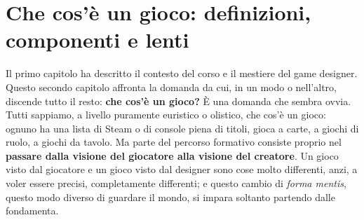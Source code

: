 
\chapter[Che cos'è un gioco]{Che cos'è un gioco: definizioni, componenti e lenti}
\label{cap:che-cos-e-un-gioco}

Il primo capitolo ha descritto il contesto del corso e il mestiere del game
designer. Questo secondo capitolo affronta la domanda da cui, in un modo o
nell'altro, discende tutto il resto: \textbf{che cos'è un gioco?} È una
domanda che sembra ovvia. Tutti sappiamo, a livello puramente euristico o
olistico, che cos'è un gioco: ognuno ha una lista di Steam o di console piena
di titoli, gioca a carte, a giochi di ruolo, a giochi da tavolo. Ma parte del
percorso formativo consiste proprio nel \textbf{passare dalla visione del
giocatore alla visione del creatore}. Un gioco visto dal giocatore e un gioco
visto dal designer sono cose molto differenti, anzi, a voler essere precisi,
completamente differenti; e questo cambio di \emph{forma mentis}, questo modo
diverso di guardare il mondo, si impara soltanto partendo dalle fondamenta.

